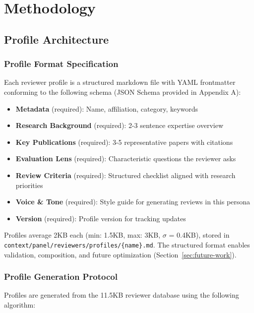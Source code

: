 \section{Methodology}

\subsection{Profile Architecture}

\subsubsection{Profile Format Specification}

Each reviewer profile is a structured markdown file with YAML frontmatter conforming to the following schema (JSON Schema provided in Appendix A):

\begin{itemize}
\item \textbf{Metadata} (required): Name, affiliation, category, keywords
\item \textbf{Research Background} (required): 2-3 sentence expertise overview
\item \textbf{Key Publications} (required): 3-5 representative papers with citations
\item \textbf{Evaluation Lens} (required): Characteristic questions the reviewer asks
\item \textbf{Review Criteria} (required): Structured checklist aligned with research priorities
\item \textbf{Voice \& Tone} (required): Style guide for generating reviews in this persona
\item \textbf{Version} (required): Profile version for tracking updates
\end{itemize}

Profiles average 2KB each (min: 1.5KB, max: 3KB, $\sigma$ = 0.4KB), stored in \texttt{context/panel/reviewers/profiles/\{name\}.md}. The structured format enables validation, composition, and future optimization (Section~\ref{sec:future-work}).

\subsubsection{Profile Generation Protocol}

Profiles are generated from the 11.5KB reviewer database using the following algorithm:

